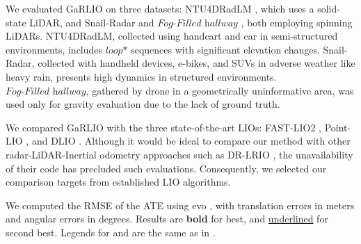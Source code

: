 We evaluated GaRLIO on three datasets: NTU4DRadLM \cite{zhang2023ntu4dradlm}, which uses a solid-state LiDAR, and Snail-Radar \cite{huai2024snail} and $\textit{Fog-Filled hallway}$ \cite{DR-LRIO}, both employing spinning LiDARs.
NTU4DRadLM, collected using handcart and car in semi-structured environments, includes $\textit{loop*}$ sequences with significant elevation changes. Snail-Radar, collected with handheld devices, e-bikes, and SUVs in adverse weather like heavy rain, presents high dynamics in structured environments. $\textit{Fog-Filled hallway}$, gathered by drone in a geometrically uninformative area, was used only for gravity evaluation due to the lack of ground truth.


We compared GaRLIO with the three state-of-the-art LIOs: FAST-LIO2 \cite{FAST-LIO}, Point-LIO \cite{POINT-LIO}, and DLIO \cite{DLIO}. Although it would be ideal to compare our method with other radar-LiDAR-Inertial odometry approaches such as DR-LRIO \cite{DR-LRIO}, the unavailability of their code has precluded such evaluations. Consequently, we selected our comparison targets from established LIO algorithms.

We computed the \ac{RMSE} of the \ac{ATE} using evo \cite{grupp2017evo}, with translation errors in meters and angular errors in degrees. Results are \textbf{bold} for best, and \underline{underlined} for second best. Legends for  and  are the same as in .

